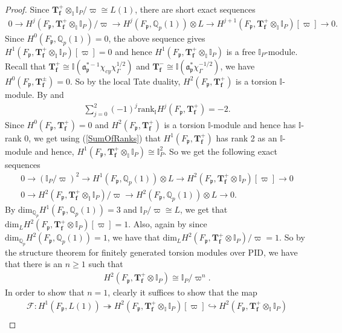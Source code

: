 \documentclass[reqno,10pt]{amsart}
\newcommand{\qp}{\mathbb{Q}_{p}}
\newcommand{\I}{\mathbb{I}}
\newcommand{\f}{\mathbf{f}}
\newcommand{\T}{\mathbf{T}}
\newcommand{\ma}{\mathfrak{a}}
\newcommand{\p}{\mathfrak{p}}
\newcommand{\vp}{\varpi}
\theoremstyle{plain}
\theoremstyle{definition}
\begin{document}
\begin{proof}
     Since $\T_\f^+ \otimes_\I \I_P/\vp \cong L(1)$, there are short exact sequences
    \begin{align*}
        0 \rightarrow H^j(F_\p,\T_\f^+ \otimes_\I \I_P)/\vp \rightarrow H^j(F_\p,\qp(1)) \otimes L \rightarrow H^{j+1}(F_\p,\T_\f^+ \otimes_\I \I_P)[\vp] \rightarrow 0.
    \end{align*}
    Since $H^0(F_\p,\qp(1)) = 0$, the above sequence gives $H^1(F_\p,\T_\f^+ \otimes_\I \I_P)[\vp] = 0$ and hence $H^1(F_\p,\T_\f^+ \otimes_\I \I_P)$ is a free $\I_P$-module. Recall that $\T_\f^+ \cong \I(\ma_\p^{*-1}\chi_{cy}\chi_\Gamma^{1/2})$ and $\T_\f^- \cong \I(\ma_\p^*\chi_\Gamma^{-1/2})$, we have $H^0(F_\p,\T_\f^\pm) = 0$. So by the local Tate duality, $H^2(F_\p,\T_\f^+)$ is a torsion $\I$-module. By \cite[Corollary 4.6.10]{Nekovar} and \cite[5.2.11]{Nekovar}
    \begin{align} \label{SumOfRanks}
        \sum_{j=0}^{2} (-1)^j \mathrm{rank}_\I H^j(F_\p,\T_\f^+) = -2.
    \end{align}
    Since $H^0(F_\p,\T_\f^+) = 0$ and $H^2(F_\p,\T_\f^+)$ is a torsion $\I$-module and hence has $\I$-rank 0, we get using (\ref{SumOfRanks}) that $H^1(F_\p,\T_\f^+)$ has rank 2 as an $\I$-module and hence, $H^1(F_\p,\T_\f^+ \otimes_\I \I_P) \cong \I_P^2$. So we get the following exact sequences
    \begin{align*}
        0 \rightarrow (\I_P/\vp)^2 \rightarrow H^1(F_\p,\qp(1)) \otimes L \rightarrow H^2(F_\p,\T_\f^+ \otimes \I_P)[\vp] \rightarrow 0 \\
        0 \rightarrow H^2(F_\p,\T_\f^+ \otimes_\I \I_P)/\vp \rightarrow H^2(F_\p,\qp(1)) \otimes L \rightarrow 0.
    \end{align*}
    By \cite[Section 11.3]{Nekovar} $\mathrm{dim}_{\qp} H^1(F_\p,\qp(1)) = 3$ and $\I_P/\vp \cong L$, we get that $\mathrm{dim}_L H^2(F_\p,\T_\f^+ \otimes \I_P)[\vp] = 1$. Also, again by \cite[Section 11.3]{Nekovar} since $\mathrm{dim}_{\qp} H^2(F_\p,\qp(1)) = 1$, we have that $\mathrm{dim}_L H^2(F_\p,\T_\f^+ \otimes \I_P)/\vp = 1$. So by the structure theorem for finitely generated torsion modules over PID, we have that there is an $n \geq 1$ such that
    \begin{align*}
        H^2(F_\p,\T_\f^+ \otimes \I_P) \cong \I_P/\vp^n.
    \end{align*}
    In order to show that $n=1$, clearly it suffices to show that the map
    \begin{align*}
        \mathcal{F} : H^1(F_\p,L(1)) \twoheadrightarrow H^2(F_\p,\T_\f^+ \otimes_\I \I_P) [\vp] \hookrightarrow H^2(F_\p,\T_\f^+ \otimes_\I \I_P) \\

\end{align*}
\end{proof}
\end{document}
